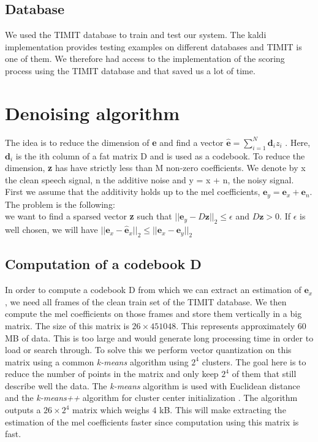 \documentclass[a4paper]{report}
\newcommand{\ehat}{\hat{\textbf{e}}}
\newcommand{\ey}{\textbf{e}_y}
\newcommand{\ex}{\textbf{e}_x}
\newcommand{\en}{\textbf{e}_n}
\newcommand{\exhat}{ \hat{\textbf{e}}_x }
\begin{document}
\subsection{Database}
We used the TIMIT database to train and test our system. The kaldi implementation provides testing examples on different databases and TIMIT is one of them. We therefore had access to the implementation of the scoring process using the TIMIT database and that saved us a lot of time.

\section{Denoising algorithm}
The idea is to reduce the dimension of \textbf{e} and find a vector $\ehat = \sum_{i=1}^N\textbf{d}_iz_i$ . Here, $\textbf{d}_i$ is the ith column of a fat matrix D and is used as a codebook. To reduce the dimension, \textbf{z} has have strictly less than M non-zero coefficients.
We denote by x the clean speech signal, n the additive noise and y = x + n, the noisy signal. 
First we assume that the additivity holds up to the mel coefficients, $\ey= \ex + \en$.\\
The problem is the following:\\
we want to find a sparsed vector \textbf{z} such that $||\ey-D\textbf{z}||_2 \leq \epsilon$ and $D\mathbf{z} > 0$. If $\epsilon$ is well chosen, we will have $||\ex - \exhat||_2 \leq ||\ex - \ey||_2$

\subsection{Computation of a codebook D}
In order to compute a codebook D from which we can extract an estimation of $\ex$, we need all frames of the clean train set of the TIMIT database. We then compute the mel coefficients on
those frames and store them vertically in a big matrix. The size of this matrix is $26 \times 451048$. This represents approximately 60 MB of data. This is too large and would generate long
processing time in order to load or search through. To solve this we perform vector quantization on this matrix using a common \textit{k-means} algorithm using $2^{4}$ clusters. The goal here
is to reduce the number of points in the matrix and only keep $2^{4}$ of them that still describe well the data. The \textit{k-means} algorithm is used with Euclidean distance
and the \textit{k-means++} algorithm for cluster center initialization \cite{arthur2007k}. The algorithm outputs a $26 \times 2^{4}$ matrix which weighs 4 kB. This will make extracting the
estimation of the mel coefficients faster since computation using this matrix is fast.
\end{document}
